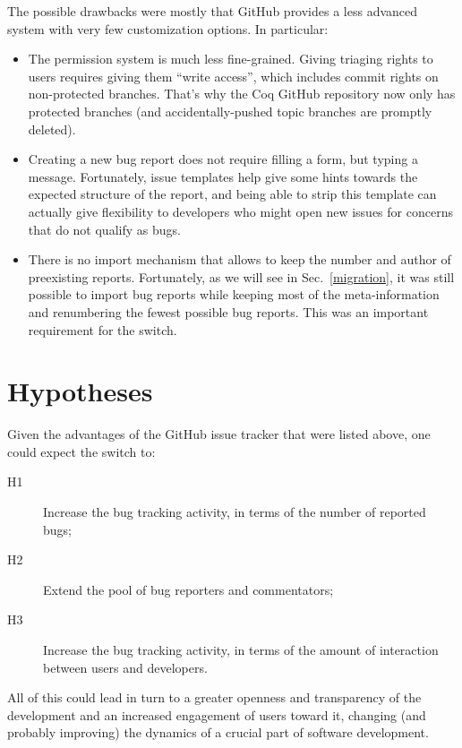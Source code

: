 \documentclass[conference]{IEEEtran}
\begin{document}
The possible drawbacks were mostly that GitHub provides a less advanced system with very few customization options. In particular:
\begin{itemize}
\item The permission system is much less fine-grained. Giving triaging rights to users requires giving them ``write access'', which includes commit rights on non-protected branches. That's why the Coq GitHub repository now only has protected branches (and accidentally-pushed topic branches are promptly deleted).
\item Creating a new bug report does not require filling a form, but typing a message. Fortunately, issue templates help give some hints towards the expected structure of the report, and being able to strip this template can actually give flexibility to developers who might open new issues for concerns that do not qualify as bugs.
\item There is no import mechanism that allows to keep the number and author of preexisting reports. Fortunately, as we will see in Sec.~\ref{migration}, it was still possible to import bug reports while keeping most of the meta-information and renumbering the fewest possible bug reports. This was an important requirement for the switch.
\end{itemize}

\section{Hypotheses}

\label{hypotheses}

Given the advantages of the GitHub issue tracker that were listed above, one could expect the switch to:
\begin{description}
\item[H1] Increase the bug tracking activity, in terms of the number of reported bugs;
\item[H2] Extend the pool of bug reporters and commentators;
\item[H3] Increase the bug tracking activity, in terms of the amount of interaction between users and developers.
\end{description}

All of this could lead in turn to a greater openness and transparency of the development and an increased engagement of users toward it, changing (and probably improving) the dynamics of a crucial part of software development. 
\end{document}
